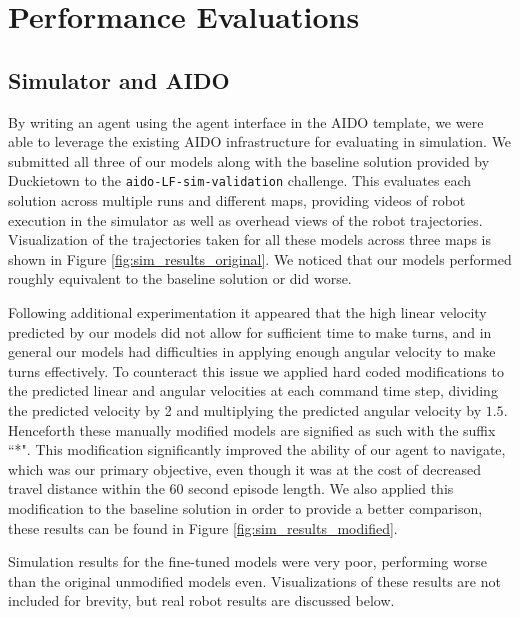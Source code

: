 \documentclass{article}
\begin{document}
\section{Performance Evaluations}

\subsection{Simulator and AIDO}

By writing an agent using the agent interface in the AIDO template, we were able to leverage the existing AIDO infrastructure for evaluating in simulation. We submitted all three of our models along with the baseline solution provided by Duckietown to the \texttt{aido-LF-sim-validation} challenge. This evaluates each solution across multiple runs and different maps, providing videos of robot execution in the simulator as well as overhead views of the robot trajectories. Visualization of the trajectories taken for all these models across three maps is shown in Figure \ref{fig:sim_results_original}. We noticed that our models performed roughly equivalent to the baseline solution or did worse.

Following additional experimentation it appeared that the high linear velocity predicted by our models did not allow for sufficient time to make turns, and in general our models had difficulties in applying enough angular velocity to make turns effectively. To counteract this issue we applied hard coded modifications to the predicted linear and angular velocities at each command time step, dividing the predicted velocity by 2 and multiplying the predicted angular velocity by $1.5$. Henceforth these manually modified models are signified as such with the suffix ``*". This modification significantly improved the ability of our agent to navigate, which was our primary objective, even though it was at the cost of decreased travel distance within the 60 second episode length. We also applied this modification to the baseline solution in order to provide a better comparison, these results can be found in Figure \ref{fig:sim_results_modified}.

Simulation results for the fine-tuned models were very poor, performing worse than the original unmodified models even. Visualizations of these results are not included for brevity, but real robot results are discussed below.
\end{document}
